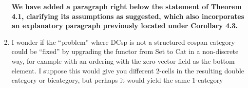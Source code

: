 \documentclass[reqno]{amsart}
\begin{document}
\begin{enumerate}
{\bf We have added a paragraph right below the statement of Theorem 4.1, clarifying its assumptions as suggested, which also incorporates an 
explanatory paragraph previously located under Corollary 4.3.}

\item I wonder if the “problem” where DCsp is not a structured cospan category could be “fixed” by upgrading the functor from Set to Cat in a 
non-discrete 
way, for example with an ordering with the zero vector field as the bottom element. I suppose this would give you different 2-cells in the resulting 
double category or bicategory, but perhaps it would yield the same 1-category
\end{enumerate}
\end{document}
